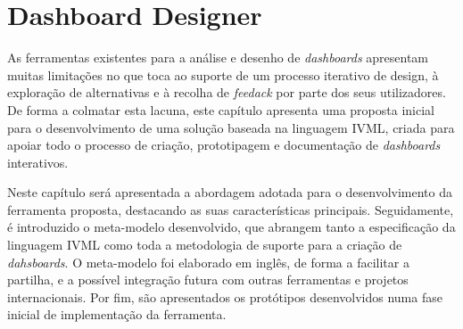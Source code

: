 
%

\chapter{Dashboard Designer}
\label{cha:dashboard_designer}



As ferramentas existentes para a análise e desenho de \textit{dashboards} apresentam muitas limitações no que toca ao suporte de um processo iterativo de design, à exploração de alternativas e à recolha de \textit{feedack} por parte dos seus utilizadores. De forma a colmatar esta lacuna, este capítulo apresenta uma proposta inicial para o desenvolvimento de uma solução baseada na linguagem \gls{IVML}, criada para apoiar todo o processo de criação, prototipagem e documentação de \textit{dashboards} interativos.

Neste capítulo será apresentada a abordagem adotada para o desenvolvimento da ferramenta proposta, destacando as suas características principais. Seguidamente, é introduzido o meta-modelo desenvolvido, que abrangem tanto a especificação da linguagem \gls{IVML} como toda a metodologia de suporte para a criação de \textit{dahsboards}. O meta-modelo foi elaborado em inglês, de forma a facilitar a partilha, e a possível integração futura com outras ferramentas e projetos internacionais. Por fim, são apresentados os protótipos desenvolvidos numa fase inicial de implementação da ferramenta.


